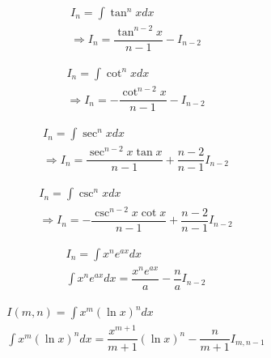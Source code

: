 \begin{align}
	I_n=\int \tan^n x dx\nonumber\\
	\Rightarrow I_n=\dfrac{\tan^{n-2} x}{n-1}-I_{n-2}
\end{align}

\begin{align}
	I_n=\int \cot^n x dx\nonumber\\
	\Rightarrow I_n=-\dfrac{\cot^{n-2} x}{n-1}-I_{n-2}
\end{align}

\begin{align}
	I_n=\int \sec^n x dx\nonumber\\
	\Rightarrow I_n=\dfrac{\sec^{n-2}x\tan x}{n-1}+\dfrac{n-2}{n-1}I_{n-2}
\end{align}

\begin{align}
	I_n=\int \csc^n x dx\nonumber\\
	\Rightarrow I_n=-\dfrac{\csc^{n-2}x\cot x}{n-1}+\dfrac{n-2}{n-1}I_{n-2}
\end{align}

\begin{align}
	I_n=\int x^n e^{ax} dx\\
	\int x^n e^{ax} dx=\dfrac{x^n e^{ax}}{a}-\dfrac{n}{a}I_{n-2}
\end{align}

\begin{align}
	I(m,n)=\int x^m (\ln x)^n dx\\
	\int x^m (\ln x)^n dx=\dfrac{x^{m+1}}{m+1}(\ln x)^n-\dfrac{n}{m+1}I_{m,n-1}
\end{align}
